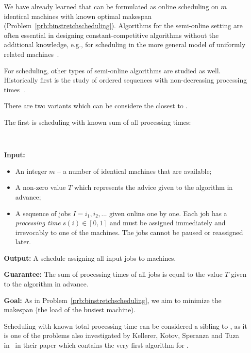 We have already learned that \binstretch can be formulated as online
scheduling on $m$ identical machines with known optimal makespan
(Problem~\ref{prb:binstretchscheduling}). Algorithms for the
semi-online setting are often essential in designing
constant-competitive algorithms without the additional knowledge,
e.g., for scheduling in the more general model of uniformly related
machines~\cite{AsAFPW97,BeChKa00,EbJaSg09}.

For scheduling, other types of semi-online algorithms are
studied as well. Historically first is the study of ordered sequences with
non-decreasing processing times~\cite{Graham69}.

There are two variants which can be considere the closest to \binstretch.

The first is scheduling with known sum of all processing times:

\begin{prb}[\schedulingtptshort]~
\label{prb:schedulingtpt}

\smallskip

\noindent\textbf{Input:}

\begin{itemize}
\item An integer $m$ -- a number of identical machines that are available;
\item A non-zero value $T$ which represents the advice given to the algorithm in advance;
\item A sequence of jobs $I=i_1, i_2, \ldots$ given online one by one. Each job has
a \textit{processing time} $s(i) \in [0,1]$ and must be assigned immediately and irrevocably
to one of the machines. The jobs cannot be paused or reassigned later.
\end{itemize}

\noindent\textbf{Output:} A schedule assigning all input jobs to machines.

\noindent\textbf{Guarantee:} The sum of processing times of all jobs is equal to the value
$T$ given to the algorithm in advance.

\noindent\textbf{Goal:} As in Problem~\ref{prb:binstretchscheduling}, we aim to minimize the
makespan (the load of the busiest machine).

\noindent
\smallskip
\end{prb}

Scheduling with known total processing time can be considered a
sibling to \binstretch, as it is one of the problems also investigated
by Kellerer, Kotov, Speranza and Tuza in~\cite{KeKoST97} in their
paper which contains the very first algorithm for \binstretch.


